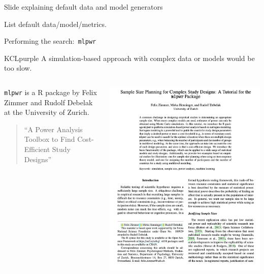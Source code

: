 \documentclass[11pt]{beamer}
\begin{document}
\begin{frame}[t]{Slide explaining default data and model generators}

	List default data/model/metrics.

\end{frame}

\begin{frame}{Performing the search:\ \texttt{mlpwr}}

	\begin{cbox}{KCLpurple}{}
		A simulation-based approach with complex data or models would be too
		slow.
	\end{cbox}

	\begin{columns}
		\begin{column}[c]{0.5\textwidth}
			\texttt{mlpwr} is a R package by Felix Zimmer and Rudolf Debelak at
			the University of Zurich.
			\begin{quote}
				``A Power Analysis Toolbox to Find Cost-Efficient Study Designs''
			\end{quote}
		\end{column}
		\begin{column}[c]{0.5\textwidth}
			\includegraphics[width=\textwidth]{figures/mlpwr_paper.png}
		\end{column}
	\end{columns}

\end{frame}
\end{document}
